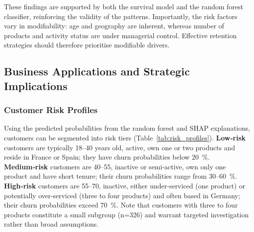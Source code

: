 \documentclass[12pt]{article}
\begin{document}
These findings are supported by both the survival model and the random forest classifier, reinforcing the validity of the patterns.  Importantly, the risk factors vary in modifiability: age and geography are inherent, whereas number of products and activity status are under managerial control.  Effective retention strategies should therefore prioritise modifiable drivers.

\subsection{Business Applications and Strategic Implications}

\subsubsection{Customer Risk Profiles}
Using the predicted probabilities from the random forest and SHAP explanations, customers can be segmented into risk tiers (Table~\ref{tab:risk_profiles}).  \textbf{Low‑risk} customers are typically 18–40 years old, active, own one or two products and reside in France or Spain; they have churn probabilities below 20~\%.  \textbf{Medium‑risk} customers are 40–55, inactive or semi‑active, own only one product and have short tenure; their churn probabilities range from 30–60~\%.  \textbf{High‑risk} customers are 55–70, inactive, either under‑serviced (one product) or potentially over‑serviced (three to four products) and often based in Germany; their churn probabilities exceed 70~\%.  Note that customers with three to four products constitute a small subgroup (n=326) and warrant targeted investigation rather than broad assumptions.
\end{document}
